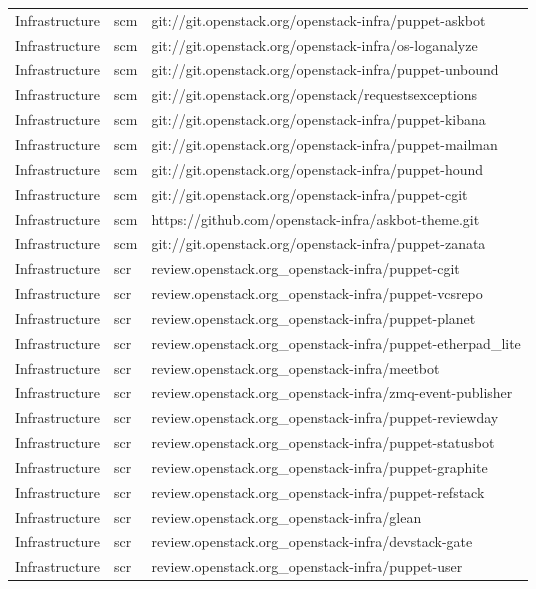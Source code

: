 \begin{center}
\begin{longtable}{|p{4cm}|p{1cm}|p{10cm}|}
Infrastructure&scm&git://git.openstack.org/openstack-infra/puppet-askbot\\ 
Infrastructure&scm&git://git.openstack.org/openstack-infra/os-loganalyze\\ 
Infrastructure&scm&git://git.openstack.org/openstack-infra/puppet-unbound\\ 
Infrastructure&scm&git://git.openstack.org/openstack/requestsexceptions\\ 
Infrastructure&scm&git://git.openstack.org/openstack-infra/puppet-kibana\\ 
Infrastructure&scm&git://git.openstack.org/openstack-infra/puppet-mailman\\ 
Infrastructure&scm&git://git.openstack.org/openstack-infra/puppet-hound\\ 
Infrastructure&scm&git://git.openstack.org/openstack-infra/puppet-cgit\\ 
Infrastructure&scm&https://github.com/openstack-infra/askbot-theme.git\\ 
Infrastructure&scm&git://git.openstack.org/openstack-infra/puppet-zanata\\ 
Infrastructure&scr&review.openstack.org\_openstack-infra/puppet-cgit\\ 
Infrastructure&scr&review.openstack.org\_openstack-infra/puppet-vcsrepo\\ 
Infrastructure&scr&review.openstack.org\_openstack-infra/puppet-planet\\ 
Infrastructure&scr&review.openstack.org\_openstack-infra/puppet-etherpad\_lite\\ 
Infrastructure&scr&review.openstack.org\_openstack-infra/meetbot\\ 
Infrastructure&scr&review.openstack.org\_openstack-infra/zmq-event-publisher\\ 
Infrastructure&scr&review.openstack.org\_openstack-infra/puppet-reviewday\\ 
Infrastructure&scr&review.openstack.org\_openstack-infra/puppet-statusbot\\ 
Infrastructure&scr&review.openstack.org\_openstack-infra/puppet-graphite\\ 
Infrastructure&scr&review.openstack.org\_openstack-infra/puppet-refstack\\ 
Infrastructure&scr&review.openstack.org\_openstack-infra/glean\\ 
Infrastructure&scr&review.openstack.org\_openstack-infra/devstack-gate\\ 
Infrastructure&scr&review.openstack.org\_openstack-infra/puppet-user\\ 

\end{longtable}
\end{center}
